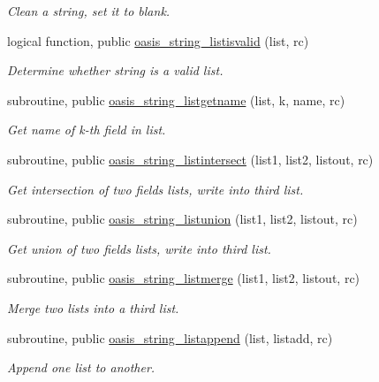 \begin{DoxyCompactItemize}
\begin{DoxyCompactList}\small\item\em Clean a string, set it to blank. \end{DoxyCompactList}\item 
logical function, public \hyperlink{namespacemod__oasis__string_ae8c50e9742e1f24cc0d7bfa9d476cd95}{oasis\+\_\+string\+\_\+listisvalid} (list, rc)
\begin{DoxyCompactList}\small\item\em Determine whether string is a valid list. \end{DoxyCompactList}\item 
subroutine, public \hyperlink{namespacemod__oasis__string_a4d3a28944ce786f4d8d8a9555c63f8cd}{oasis\+\_\+string\+\_\+listgetname} (list, k, name, rc)
\begin{DoxyCompactList}\small\item\em Get name of k-\/th field in list. \end{DoxyCompactList}\item 
subroutine, public \hyperlink{namespacemod__oasis__string_a8b9648bf4eb3a2373f1fac49e572436f}{oasis\+\_\+string\+\_\+listintersect} (list1, list2, listout, rc)
\begin{DoxyCompactList}\small\item\em Get intersection of two fields lists, write into third list. \end{DoxyCompactList}\item 
subroutine, public \hyperlink{namespacemod__oasis__string_a3482d80f258c8062e8dd0d4eff8135b7}{oasis\+\_\+string\+\_\+listunion} (list1, list2, listout, rc)
\begin{DoxyCompactList}\small\item\em Get union of two fields lists, write into third list. \end{DoxyCompactList}\item 
subroutine, public \hyperlink{namespacemod__oasis__string_adb1544a078e3abd743749f857fca5aee}{oasis\+\_\+string\+\_\+listmerge} (list1, list2, listout, rc)
\begin{DoxyCompactList}\small\item\em Merge two lists into a third list. \end{DoxyCompactList}\item 
subroutine, public \hyperlink{namespacemod__oasis__string_a47bd1c6d7ee6ea7dcec169fa140481aa}{oasis\+\_\+string\+\_\+listappend} (list, listadd, rc)
\begin{DoxyCompactList}\small\item\em Append one list to another. \end{DoxyCompactList}\item 

\end{DoxyCompactItemize}
